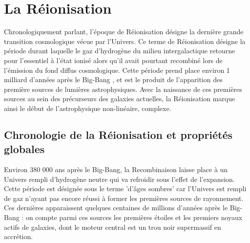\chapter{La Réionisation}

Chronologiquement parlant, l'époque de Réionisation désigne la dernière grande transition cosmologique vécue par l'Univers. Ce terme de Réionisation désigne la période durant laquelle le gaz d'hydrogène du milieu intergalactique retourne pour l'essentiel à l'état ionisé alors qu'il avait pourtant recombiné lors de l'émission du fond diffus cosmologique. Cette période prend place environ 1 milliard d'années après le Big-Bang , et est le produit de l'apparition des première sources de lumières astrophysiques. Avec la naissance de ces premières sources au sein des précurseurs des galaxies actuelles, la Réionisation marque ainsi le début de l'astrophysique non-linéaire, complexe.

\section{Chronologie de la Réionisation et propriétés globales}
Environ 380 000 ans après le Big-Bang, la Recombinaison laisse place à un Univers rempli d'hydrogène neutre qui va refroidir sous l'effet de l'expansion. Cette période est désignée sous le terme 'd'âges sombres' car l'Univers est rempli de gaz n'ayant pas encore réussi à former les premières sources de rayonnement. Ces dernières apparaissent quelques centaines de millions d'années après le Big-Bang : on compte parmi ces sources les premières étoiles et les premiers noyaux actifs de galaxies, dont le moteur central est un trou noir supermassif en accrétion.

